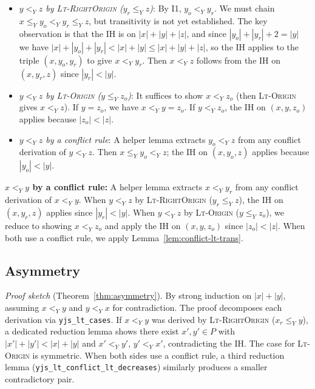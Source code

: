 \documentclass[sigplan,screen]{acmart}
\newcommand{\leanref}[1]{\texttt{#1}}
\newcommand{\YjsLt}{\mathrel{<_Y}}
\newcommand{\YjsLeq}{\mathrel{\leq_Y}}
\begin{document}
\begin{itemize}
\item \emph{$y \YjsLt z$ by \textsc{Lt-RightOrigin}
  ($y_r \YjsLeq z$)}:
  By I1, $y_o \YjsLt y_r$.  We must chain
  $x \YjsLeq y_o \YjsLt y_r \YjsLeq z$,
  but transitivity is not yet established.
  The key observation is that the IH is on
  $|x|+|y|+|z|$, and since
  $|y_o|+|y_r|+2 = |y|$ we have
  $|x|+|y_o|+|y_r| < |x|+|y| \le |x|+|y|+|z|$,
  so the IH applies to the triple $(x, y_o, y_r)$
  to give $x \YjsLt y_r$.  Then
  $x \YjsLt z$ follows from the IH on
  $(x, y_r, z)$ since $|y_r| < |y|$.

\item \emph{$y \YjsLt z$ by \textsc{Lt-Origin}
  ($y \YjsLeq z_o$)}:
  It suffices to show $x \YjsLt z_o$
  (then \textsc{Lt-Origin} gives $x \YjsLt z$).
  If $y = z_o$, we have $x \YjsLt y = z_o$.
  If $y \YjsLt z_o$, the IH on $(x, y, z_o)$
  applies because $|z_o| < |z|$.

\item \emph{$y \YjsLt z$ by a conflict rule}:
  A helper lemma extracts
  $y_o \YjsLt z$ from any conflict derivation
  of $y \YjsLt z$.  Then
  $x \YjsLeq y_o \YjsLt z$;
  the IH on $(x, y_o, z)$ applies because
  $|y_o| < |y|$.
\end{itemize}

\noindent\textbf{$x \YjsLt y$ by a conflict rule:}
A helper lemma extracts $x \YjsLt y_r$ from any
conflict derivation of $x \YjsLt y$.
When $y \YjsLt z$ by \textsc{Lt-RightOrigin}
($y_r \YjsLeq z$), the IH on $(x, y_r, z)$ applies
since $|y_r| < |y|$.
When $y \YjsLt z$ by \textsc{Lt-Origin}
($y \YjsLeq z_o$), we reduce to showing
$x \YjsLt z_o$ and apply the IH on $(x, y, z_o)$
since $|z_o| < |z|$.
When both use a conflict rule, we apply
Lemma~\ref{lem:conflict-lt-trans}.

\subsection{Asymmetry}

\noindent\textit{Proof sketch} (Theorem~\ref{thm:asymmetry}).
By strong induction on $|x| + |y|$, assuming $x \YjsLt y$
and $y \YjsLt x$ for contradiction.
The proof decomposes each derivation via
\leanref{yjs\_lt\_cases}.
If $x \YjsLt y$ was derived by \textsc{Lt-RightOrigin}
($x_r \YjsLeq y$), a dedicated reduction lemma
shows there exist $x', y' \in P$ with
$|x'| + |y'| < |x| + |y|$ and $x' \YjsLt y'$,
$y' \YjsLt x'$, contradicting the IH.
The case for \textsc{Lt-Origin} is symmetric.
When both sides use a conflict rule,
a third reduction lemma
(\leanref{yjs\_lt\_conflict\_lt\_decreases})
similarly produces a smaller contradictory pair.
\end{document}
